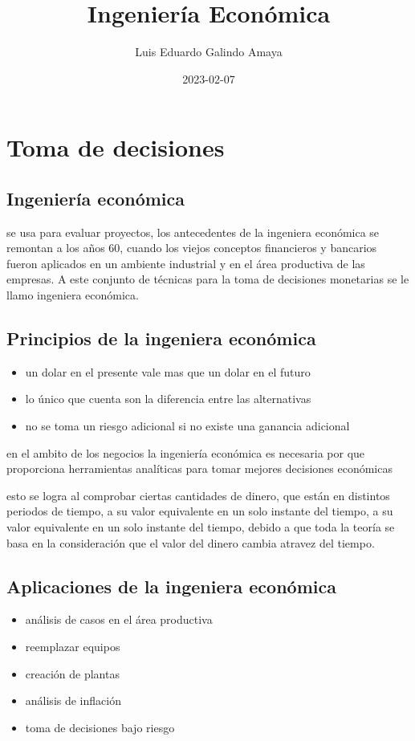 \documentclass[11pt]{article}
\author{Luis Eduardo Galindo Amaya}
\date{2023-02-07}
\title{Ingeniería Económica}
\begin{document}
\maketitle
\setcounter{tocdepth}{2}
\tableofcontents



\section*{Toma de decisiones}
\label{sec:orgde3fc53}
\subsection*{Ingeniería económica}
\label{sec:orgb924b0e}
se usa para evaluar proyectos, los antecedentes de la ingeniera económica se remontan a los años 60, cuando los viejos conceptos financieros y bancarios fueron aplicados en un ambiente industrial y en el área productiva de las empresas. A este conjunto de técnicas para la toma de decisiones monetarias se le llamo ingeniera económica.
\subsection*{Principios de la ingeniera económica}
\label{sec:orgd3420d4}
\begin{itemize}
\item un dolar en el presente vale mas que un dolar en el futuro
\item lo único que cuenta son la diferencia entre las alternativas
\item no se toma un riesgo adicional si no existe una ganancia adicional
\end{itemize}

en el ambito de los negocios la ingeniería económica es necesaria por que proporciona herramientas analíticas para tomar mejores decisiones económicas

esto se logra al comprobar ciertas cantidades de dinero, que están en distintos periodos de tiempo, a su valor equivalente en un solo instante del tiempo, a su valor equivalente en un solo instante del tiempo, debido a que toda la teoría se basa en la consideración que el valor del dinero cambia atravez del tiempo.

\subsection*{Aplicaciones de la ingeniera económica}
\label{sec:org981cdae}
\begin{itemize}
\item análisis de casos en el área productiva
\item reemplazar equipos
\item creación de plantas
\item análisis de inflación
\item toma de decisiones bajo riesgo
\end{itemize}
\end{document}
